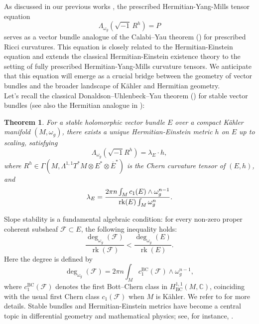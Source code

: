 \documentclass[12pt, reqno]{amsart}
\newcommand\cF{{\mathcal F}}
\newcommand{\rk}{{\rm rk}}
\theoremstyle{plain}
\newtheorem{theorem}{Theorem}[section]
\theoremstyle{definition}
\newcommand{\sq}{\sqrt{-1}}
\renewcommand{\bar}{\overline}
\newcommand{\beq}{\begin{equation}}
\newcommand{\eeq}{\end{equation}}
\newcommand{\ts}{\otimes}
\renewcommand{\>}{\rightarrow}
\renewcommand{\>}{\rightarrow}
\newcommand{\om}{\omega}
\renewcommand{\bar}{\overline}
\numberwithin{equation}{section} %
\begin{document}
As discussed in our previous works \cite{WYY26+, FWYY26+, WYY26b+, XYY26+}, the prescribed Hermitian-Yang-Mills tensor equation
\beq \Lambda_{\om_g}\left(\sqrt{-1}\, R^h\right) =P\eeq
 serves as a vector bundle analogue of the Calabi–Yau theorem (\cite{Cal57,Yau78}) for prescribed Ricci curvatures. This equation is  closely related to the Hermitian-Einstein equation and extends the classical Hermitian-Einstein existence theory to the setting of fully prescribed Hermitian-Yang-Mills curvature tensors. We anticipate that this equation will emerge as a crucial bridge between the geometry of vector bundles and the broader landscape of K\"ahler and Hermitian geometry.\\


 Let's recall the classical Donaldson--Uhlenbeck--Yau theorem (\cite{Don85, UY86, Don87}) for stable vector bundles (see also the Hermitian analogue in \cite{LY86}):  \setcounter{theorem}{0}
\renewcommand{\thetheorem}{\Alph{theorem}}\begin{theorem} \label{DUY} For  a stable holomorphic vector bundle $E$ over a compact K\"ahler manifold $(M,\omega_g)$,  there exists a unique Hermitian-Einstein metric $h$ on $E$ up to scaling, satisfying
    \beq \Lambda_{\omega_g} \left(\sq R^h\right)=\lambda_E\cdot h, \label{HE} \eeq
    where $R^h\in\Gamma(M,\Lambda^{1,1}T^*M\ts E^*\ts \bar E^*)$ is the Chern curvature tensor of $(E,h)$, and
\beq
\lambda_E=\frac{2\pi n\int_M c_1(E)\wedge
	\omega_g^{n-1}}{\mathrm{\rk}(E)\int_M\omega_g^n}.\eeq  \end{theorem}

\noindent Slope stability is a fundamental algebraic condition:  for every non-zero proper coherent subsheaf $\mathcal{F} \subset E$, the following inequality holds:
\beq 
\frac{\deg_{\omega_g}(\mathcal{F})}{\operatorname{rk}(\mathcal{F})} < \frac{\deg_{\omega_g}(E)}{\operatorname{rk}(E)}.
\label{stable condition}
\eeq 
Here the degree is  defined by
\beq 
\deg_{\omega_g}(\mathcal{F}) = 2\pi n \int_M c^{\mathrm{BC}}_1(\mathcal{F}) \wedge \omega_g^{n-1},
\eeq 
where $c^{\mathrm{BC}}_1(\cF)$ denotes the first Bott--Chern class in $H^{1,1}_{\mathrm{BC}}(M, \mathbb{C})$, coinciding with the usual first Chern class $c_1(\cF)$ when $M$ is K\"ahler. We refer to \cite{Kob87} for more details. 
 Stable bundles and Hermitian-Einstein metrics have become a central topic in differential geometry and mathematical physics; see, for instance, \cite{NS65, Siu87, Sim88, Sim92, BGP96, Li00, DW04, Jac14, LZ15, JW18, Fu19, CS20, DS21, Li21, Wu23, CW24, MPS25}.
\end{document}
